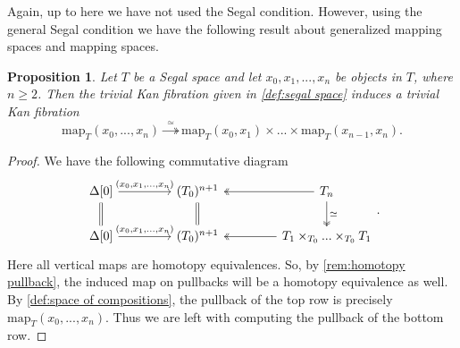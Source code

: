 \documentclass[11pt, a4paper]{amsart}
\newcommand{\map}{\mathrm{map}}
\newtheorem{proposition}[equation]{Proposition}
\theoremstyle{definition}
\theoremstyle{remark}
\numberwithin{equation}{section}
\begin{document}
Again, up to here we have not used the Segal condition. However, using the general Segal condition we have the following result about generalized mapping spaces and mapping spaces.

\begin{proposition} \label{prop:generalized mapping space mapping space}
  Let $T$ be a Segal space and let $x_0,x_1, ..., x_n$ be objects in $T$, where $n \geq 2$. Then the trivial Kan fibration given in \cref{def:segal space} induces a trivial Kan fibration
  \[\map_T(x_0,...,x_n) \overset{ \ \ \simeq \ \ }{\twoheadrightarrow} \map_T(x_0,x_1) \times  ... \times \map_T(x_{n-1},x_n).\]
\end{proposition}

\begin{proof}
  We have the following commutative diagram
  \[
  \begin{tikzcd}[column sep=1.5cm]
    \Delta[0] \arrow[r, "{(x_0,x_1, ..., x_n)}"]  \arrow[d, equal] & (T_0)^{n+1} \arrow[d, equal] & T_n \arrow[d, "\simeq", twoheadrightarrow]  \arrow[l, twoheadrightarrow] \\
    \Delta[0] \arrow[r, "{(x_0,x_1, ..., x_n)}"] & (T_0)^{n+1} & T_1 \times_{T_0} ... \times_{T_0} T_1 \arrow[l, twoheadrightarrow]
  \end{tikzcd}.
  \]
  Here all vertical maps are homotopy equivalences. So, by \cref{rem:homotopy pullback}, the induced map on pullbacks will be a homotopy equivalence as well. By \cref{def:space of compositions}, the pullback of the top row is precisely $\map_T(x_0,...,x_n)$. Thus we are left with computing the pullback of the bottom row.


\end{proof}
\end{document}
